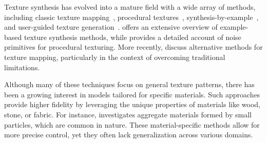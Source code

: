 
Texture synthesis has evolved into a mature field with a wide array of methods, including classic texture mapping~\citep{blinn76}, procedural textures~\citep{perlin-1985}, synthesis-by-example~\citep{efros99}, and user-guided texture generation~\citep{haeberli90}. \citet{pauly-2009} offers an extensive overview of example-based texture synthesis methods, while \citet{etal-2010} provides a detailed account of noise primitives for procedural texturing. More recently, \citet{rethinkngtex} discuss alternative methods for texture mapping, particularly in the context of overcoming traditional limitations.
%

Although many of these techniques focus on general texture patterns, there has been a growing interest in models tailored for specific materials. Such approaches provide higher fidelity by leveraging the unique properties of materials like wood, stone, or fabric. For instance, \citet{dorsey-2004} investigates aggregate materials formed by small particles, which are common in nature. These material-specific methods allow for more precise control, yet they often lack generalization across various domains.




